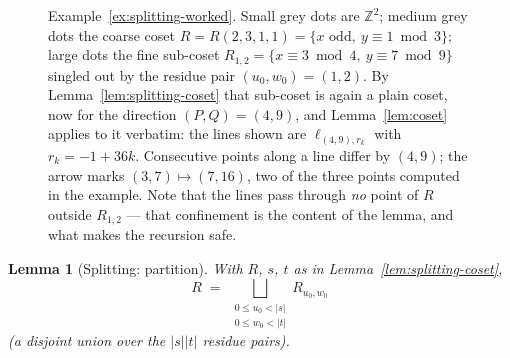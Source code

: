 \documentclass[a4paper,11pt,oneside,reqno]{amsart}
\theoremstyle{definition}
\theoremstyle{remark}
\theoremstyle{plain}
\newtheorem{lemma}[definition]{Lemma}
\newcommand{\Z}{\mathbb{Z}}
\begin{document}
\begin{figure}[htbp]
  \centering
  \caption{Example~\ref{ex:splitting-worked}. Small grey dots are \(\Z^2\); medium grey dots the
    coarse coset \(R=R(2,3,1,1)=\{x \text{ odd},\ y\equiv1\bmod 3\}\); large dots the fine
    sub-coset \(R_{1,2}=\{x\equiv3\bmod4,\ y\equiv7\bmod9\}\) singled out by the residue pair
    \((u_0,w_0)=(1,2)\). By Lemma~\ref{lem:splitting-coset} that sub-coset is again a plain coset,
    now for the direction \((P,Q)=(4,9)\), and Lemma~\ref{lem:coset} applies to it verbatim: the
    lines shown are \(\ell_{(4,9),r_k}\) with \(r_k=-1+36k\). Consecutive points along a line
    differ by \((4,9)\); the arrow marks \((3,7)\mapsto(7,16)\), two of the three points computed
    in the example. Note that the lines pass through \emph{no} point of \(R\) outside
    \(R_{1,2}\) --- that confinement is the content of the lemma, and what makes the recursion
    safe.}
  \label{fig:splitting-example}
\end{figure}

\begin{lemma}[Splitting: partition]
  \label{lem:splitting-partition}
  With \(R\), \(s\), \(t\) as in Lemma~\ref{lem:splitting-coset},
  \begin{equation}
    \label{eq:splitting-partition-conclusion}
    R \;=\; \bigsqcup_{\substack{0\le u_0<|s| \\ 0\le w_0<|t|}} R_{u_0,w_0}
  \end{equation}
  (a disjoint union over the \(|s||t|\) residue pairs).
\end{lemma}
\end{document}

